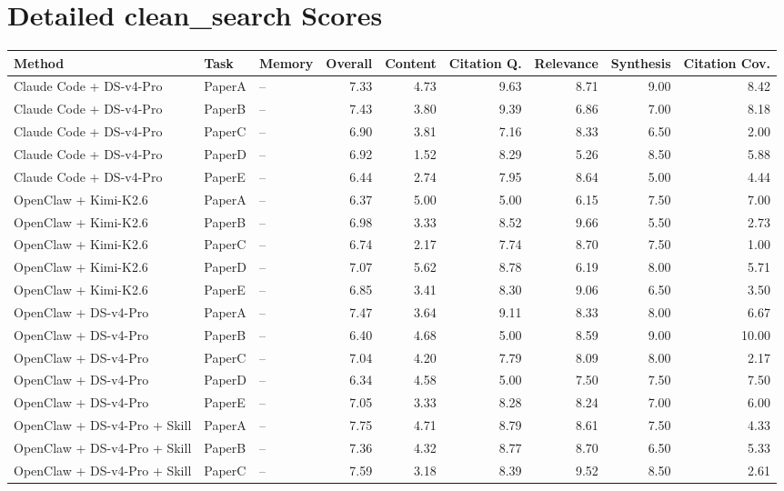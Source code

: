 \documentclass[10pt]{article}
\begin{document}
\section*{Detailed clean\_search Scores}
\begin{table}[t]
\centering
\scriptsize
\begin{tabular}{lllrrrrrr}
\toprule
Method & Task & Memory & Overall & Content & Citation Q. & Relevance & Synthesis & Citation Cov. \\
\midrule
Claude Code + DS-v4-Pro & PaperA & -- & 7.33 & 4.73 & 9.63 & 8.71 & 9.00 & 8.42 \\
Claude Code + DS-v4-Pro & PaperB & -- & 7.43 & 3.80 & 9.39 & 6.86 & 7.00 & 8.18 \\
Claude Code + DS-v4-Pro & PaperC & -- & 6.90 & 3.81 & 7.16 & 8.33 & 6.50 & 2.00 \\
Claude Code + DS-v4-Pro & PaperD & -- & 6.92 & 1.52 & 8.29 & 5.26 & 8.50 & 5.88 \\
Claude Code + DS-v4-Pro & PaperE & -- & 6.44 & 2.74 & 7.95 & 8.64 & 5.00 & 4.44 \\
OpenClaw + Kimi-K2.6 & PaperA & -- & 6.37 & 5.00 & 5.00 & 6.15 & 7.50 & 7.00 \\
OpenClaw + Kimi-K2.6 & PaperB & -- & 6.98 & 3.33 & 8.52 & 9.66 & 5.50 & 2.73 \\
OpenClaw + Kimi-K2.6 & PaperC & -- & 6.74 & 2.17 & 7.74 & 8.70 & 7.50 & 1.00 \\
OpenClaw + Kimi-K2.6 & PaperD & -- & 7.07 & 5.62 & 8.78 & 6.19 & 8.00 & 5.71 \\
OpenClaw + Kimi-K2.6 & PaperE & -- & 6.85 & 3.41 & 8.30 & 9.06 & 6.50 & 3.50 \\
OpenClaw + DS-v4-Pro & PaperA & -- & 7.47 & 3.64 & 9.11 & 8.33 & 8.00 & 6.67 \\
OpenClaw + DS-v4-Pro & PaperB & -- & 6.40 & 4.68 & 5.00 & 8.59 & 9.00 & 10.00 \\
OpenClaw + DS-v4-Pro & PaperC & -- & 7.04 & 4.20 & 7.79 & 8.09 & 8.00 & 2.17 \\
OpenClaw + DS-v4-Pro & PaperD & -- & 6.34 & 4.58 & 5.00 & 7.50 & 7.50 & 7.50 \\
OpenClaw + DS-v4-Pro & PaperE & -- & 7.05 & 3.33 & 8.28 & 8.24 & 7.00 & 6.00 \\
OpenClaw + DS-v4-Pro + Skill & PaperA & -- & 7.75 & 4.71 & 8.79 & 8.61 & 7.50 & 4.33 \\
OpenClaw + DS-v4-Pro + Skill & PaperB & -- & 7.36 & 4.32 & 8.77 & 8.70 & 6.50 & 5.33 \\
OpenClaw + DS-v4-Pro + Skill & PaperC & -- & 7.59 & 3.18 & 8.39 & 9.52 & 8.50 & 2.61 \\

\end{tabular}
\end{table}
\end{document}
